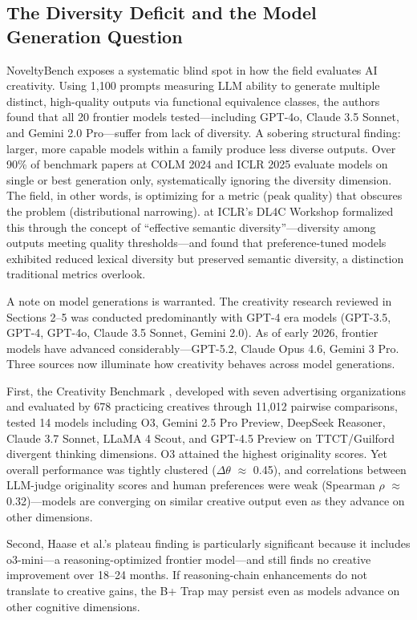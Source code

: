 \documentclass[12pt,a4paper]{article}
\begin{document}
\subsection{The Diversity Deficit and the Model Generation Question}
NoveltyBench \citep{zhang2025creative} exposes a systematic blind spot in how the field evaluates AI creativity. Using 1,100 prompts measuring LLM ability to generate multiple distinct, high-quality outputs via functional equivalence classes, the authors found that all 20 frontier models tested---including GPT-4o, Claude 3.5 Sonnet, and Gemini 2.0 Pro---suffer from lack of diversity. A sobering structural finding: larger, more capable models within a family produce less diverse outputs. Over 90\% of benchmark papers at COLM 2024 and ICLR 2025 evaluate models on single or best generation only, systematically ignoring the diversity dimension. The field, in other words, is optimizing for a metric (peak quality) that obscures the problem (distributional narrowing). \citet{shypula2025} at ICLR's DL4C Workshop formalized this through the concept of ``effective semantic diversity''---diversity among outputs meeting quality thresholds---and found that preference-tuned models exhibited reduced lexical diversity but preserved semantic diversity, a distinction traditional metrics overlook.

A note on model generations is warranted. The creativity research reviewed in Sections 2--5 was conducted predominantly with GPT-4 era models (GPT-3.5, GPT-4, GPT-4o, Claude 3.5 Sonnet, Gemini 2.0). As of early 2026, frontier models have advanced considerably---GPT-5.2, Claude Opus 4.6, Gemini 3 Pro. Three sources now illuminate how creativity behaves across model generations.

First, the Creativity Benchmark \citep{bhat2025}, developed with seven advertising organizations and evaluated by 678 practicing creatives through 11,012 pairwise comparisons, tested 14 models including O3, Gemini 2.5 Pro Preview, DeepSeek Reasoner, Claude 3.7 Sonnet, LLaMA 4 Scout, and GPT-4.5 Preview on TTCT/Guilford divergent thinking dimensions. O3 attained the highest originality scores. Yet overall performance was tightly clustered ($\Delta\theta$ $\approx$ 0.45), and correlations between LLM-judge originality scores and human preferences were weak (Spearman $\rho$ $\approx$ 0.32)---models are converging on similar creative output even as they advance on other dimensions.

Second, Haase et al.'s plateau finding is particularly significant because it includes o3-mini---a reasoning-optimized frontier model---and still finds no creative improvement over 18--24 months. If reasoning-chain enhancements do not translate to creative gains, the B+ Trap may persist even as models advance on other cognitive dimensions.
\end{document}
